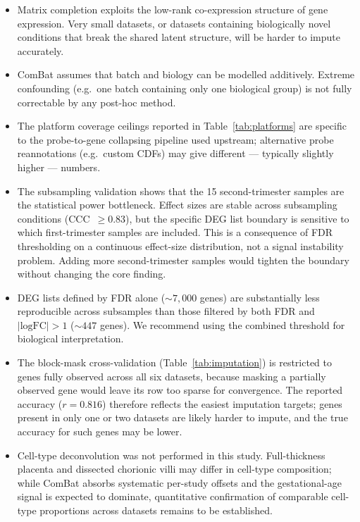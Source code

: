 \documentclass[11pt,a4paper]{article}
\begin{document}
\begin{itemize}
  \item Matrix completion exploits the low-rank co-expression
    structure of gene expression. Very small datasets, or
    datasets containing biologically novel conditions that break
    the shared latent structure, will be harder to impute
    accurately.
  \item ComBat assumes that batch and biology can be modelled
    additively. Extreme confounding (e.g.~one batch containing
    only one biological group) is not fully correctable by any
    post-hoc method.
  \item The platform coverage ceilings reported in
    Table~\ref{tab:platforms} are specific to the probe-to-gene
    collapsing pipeline used upstream; alternative probe
    reannotations
    (e.g.~custom CDFs) may give different --- typically slightly
    higher --- numbers.
  \item The subsampling validation shows that the 15
    second-trimester samples are the statistical power
    bottleneck. Effect sizes are stable across subsampling
    conditions (CCC~$\ge 0.83$), but the specific DEG list
    boundary is sensitive to which first-trimester samples are
    included. This is a consequence of FDR thresholding on a
    continuous effect-size distribution, not a signal instability
    problem. Adding more second-trimester samples would tighten
    the boundary without changing the core finding.
  \item DEG lists defined by FDR alone ($\sim\!7{,}000$ genes)
    are substantially less reproducible across subsamples than
    those filtered by both FDR and $|\text{logFC}|>1$
    ($\sim\!447$ genes). We recommend using the combined threshold
    for biological interpretation.
  \item The block-mask cross-validation (Table~\ref{tab:imputation})
    is restricted to genes fully observed across all six
    datasets, because masking a partially observed gene would
    leave its row too sparse for convergence. The reported
    accuracy ($r = 0.816$) therefore reflects the easiest
    imputation targets; genes present in only one or two datasets
    are likely harder to impute, and the true accuracy for such
    genes may be lower.
  \item Cell-type deconvolution was not performed in this study.
    Full-thickness placenta and dissected chorionic villi may
    differ in cell-type composition; while ComBat absorbs
    systematic per-study offsets and the gestational-age signal
    is expected to dominate, quantitative confirmation of
    comparable cell-type proportions across datasets remains to
    be established.
\end{itemize}
\end{document}
